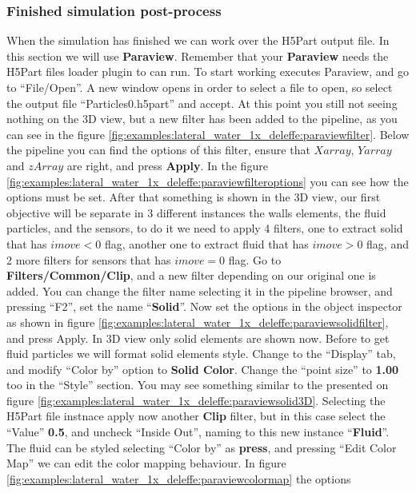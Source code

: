 \subsubsection{Finished simulation post-process}
\label{sss:example:lateral_water_1x_deleffe:postprocess:paraview}
%
When the simulation has finished we can work over the H5Part output file. In this section we will use
\textbf{Paraview}. Remember that your \textbf{Paraview} needs the H5Part files loader plugin to can run.\rc
%
To start working executes Paraview, and go to ``File/Open''. A new window opens in order to select a file to
open, so select the output file ``Particles0.h5part'' and accept. At this point you still not seeing nothing
on the 3D view, but a new filter has been added to the pipeline, as you can see in the figure
\ref{fig:examples:lateral_water_1x_deleffe:paraviewfilter}. Below the pipeline you can find the options of
this filter, ensure that $Xarray$, $Yarray$ and $zArray$ are right, and press \textbf{Apply}. In the figure
\ref{fig:examples:lateral_water_1x_deleffe:paraviewfilteroptions} you can see how the options must be set.\rc
%
After that something is shown in the 3D view, our first objective will be separate in 3 different instances
the walls elements, the fluid particles, and the sensors, to do it we need to apply 4 filters, one to extract
solid that has $imove < 0$ flag, another one to extract fluid that has $imove > 0$ flag, and 2 more filters
for sensors that has $imove = 0$ flag.\rc
%
Go to \textbf{Filters/Common/Clip}, and a new filter depending on our original one is added. You can change
the filter name selecting it in the pipeline browser, and pressing ``F2'', set the name ``\textbf{Solid}''.
Now set the options in the object inspector as shown in figure
\ref{fig:examples:lateral_water_1x_deleffe:paraviewsolidfilter}, and press Apply. In 3D view only solid
elements are shown now.\rc
%
Before to get fluid particles we will format solid elements style. Change to the ``Display'' tab, and modify
``Color by'' option to \textbf{Solid Color}. Change the ``point size'' to \textbf{1.00} too in the ``Style''
section. You may see something similar to the presented on figure
\ref{fig:examples:lateral_water_1x_deleffe:paraviewsolid3D}.\rc
%
Selecting the H5Part file instnace apply now another \textbf{Clip} filter, but in this case select the
``Value'' \textbf{0.5}, and uncheck ``Inside Out'', naming to this new instance ``\textbf{Fluid}''.\rc
%
The fluid can be styled selecting ``Color by'' as \textbf{press}, and pressing ``Edit Color Map'' we can edit
the color mapping behaviour. In figure \ref{fig:examples:lateral_water_1x_deleffe:paraviewcolormap} the options
